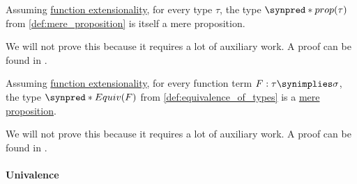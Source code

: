 \begin{proposition}\label{thm:is_prop_is_proposition}
  Assuming \hyperref[def:function_extensionality_axiom]{function extensionality}, for every type \( \tau \), the type \( \synpred*{prop}(\tau) \) from \cref{def:mere_proposition} is itself a mere proposition.
\end{proposition}
\begin{comments}
  \item We will not prove this because it requires a lot of auxiliary work. A proof can be found in \cite[lemma 3.3.5]{UnivalentFoundationsProgram2013HoTT}.
\end{comments}

\begin{proposition}\label{thm:is_equiv_is_proposition}
  Assuming \hyperref[def:function_extensionality_axiom]{function extensionality}, for every function term \( F: \tau \synimplies \sigma \), the type \( \synpred*{Equiv}(F) \) from \cref{def:equivalence_of_types} is a \hyperref[def:mere_proposition]{mere proposition}.
\end{proposition}
\begin{comments}
  \item We will not prove this because it requires a lot of auxiliary work. A proof can be found in \cite[corr. 4.6.4]{UnivalentFoundationsProgram2013HoTT}.
\end{comments}

\paragraph{Univalence}

